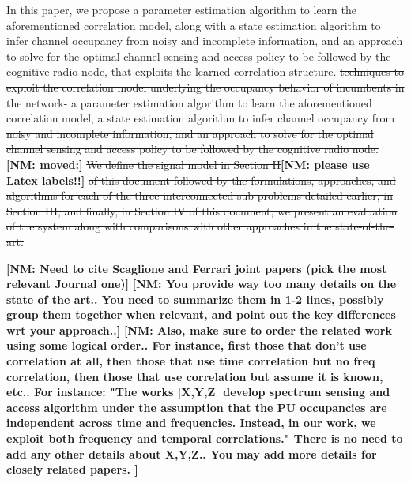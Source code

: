 \documentclass[10pt,twocolumn]{IEEEtran}
\newcommand{\sst}[1]{\st{#1}}
\newcommand{\nm}[1]{{\color{blue}\bf{[NM: #1]}}}
\begin{document}
In this paper, we propose
 a parameter estimation algorithm to learn the aforementioned correlation model, along with a state estimation algorithm to infer channel occupancy from noisy and incomplete information, and an approach to solve for the optimal channel sensing and access policy to be followed by the cognitive radio node, that exploits the learned correlation structure.\sst{
 techniques to exploit the correlation model underlying the occupancy behavior of incumbents in the network- a parameter estimation algorithm to learn the aforementioned correlation model, a state estimation algorithm to infer channel occupancy from noisy and incomplete information, and an approach to solve for the optimal channel sensing and access policy to be followed by the cognitive radio node.}\nm{moved:}\sst{ We define the signal model in Section II}\nm{please use Latex labels!!}\sst{ of this document followed by the formulations, approaches, and algorithms for each of the three interconnected sub-problems detailed earlier, in Section III, and finally, in Section IV of this document, we present an evaluation of the system along with comparisons with other approaches in the state-of-the-art.}
 
 \nm{Need to cite Scaglione and Ferrari joint papers (pick the most relevant Journal one)}
  \nm{You provide way too many details on the state of the art.. You need to summarize them in 1-2 lines, possibly group them together when relevant, and point out the key differences wrt your approach..}
\nm{Also, make sure to order the related work using some logical order.. For instance, first those that don't use correlation at all, then those that use time correlation but no freq correlation, then those that use correlation but assume it is known, etc..
For instance:
"The works [X,Y,Z] develop spectrum sensing and access algorithm under the assumption that the PU occupancies are independent across time and frequencies. Instead, in our work, we exploit both frequency and temporal correlations."
There is no need to add any other details about X,Y,Z..
You may add more details for closely related papers.
}
 
\end{document}
